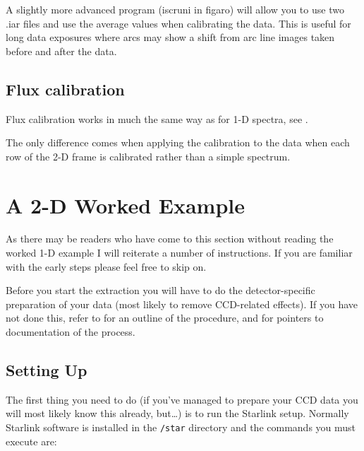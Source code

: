 A slightly more advanced program (iscruni in figaro) will allow you to use two .iar files and use the average values when calibrating the data. This is useful for long data exposures where arcs may show a shift from arc line images taken before and after the data.


\subsection{Flux calibration}

Flux calibration works in much the same way as for 1-D spectra, see 
\scspec{\S\ref{flux_calibration}}
{}.

The only difference comes when applying the calibration to the data when each row of the 2-D frame is calibrated rather than a simple spectrum.



\section{A 2-D Worked Example}

As there may be readers who have come to this section without reading the worked 1-D example I will reiterate a number of instructions. If you are familiar with the early steps please feel free to skip on.

Before you start the extraction you will have to do the
detector-specific preparation of your data (most likely to remove
CCD-related effects).
If you have not done this, refer to \scspec{\S\ref{image_preparation}}
{} for an outline of the
procedure, and \scspec{\S\ref{other_sources}}
{} for pointers
to documentation of the process.


\subsection{Setting Up}

The first thing you need to do (if you've managed to prepare your CCD
data you will most likely know this already, but\ldots ) is to run the
Starlink setup.
Normally Starlink software is installed in the \verb+/star+ directory
and the commands you must execute are:

